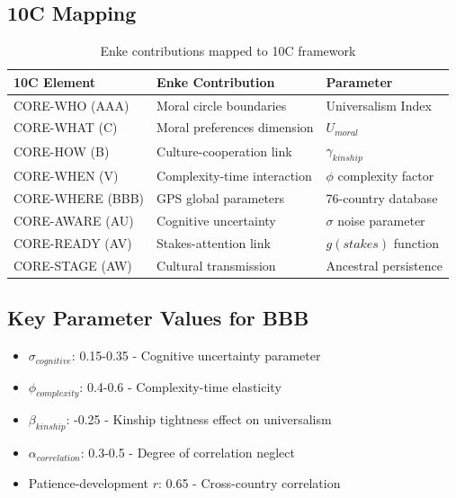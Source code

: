 \subsection{10C Mapping}

\begin{table}[h]
\centering
\begin{tabular}{lll}
\textbf{10C Element} & \textbf{Enke Contribution} & \textbf{Parameter} \\
\hline
CORE-WHO (AAA) & Moral circle boundaries & Universalism Index \\
CORE-WHAT (C) & Moral preferences dimension & $U_{moral}$ \\
CORE-HOW (B) & Culture-cooperation link & $\gamma_{kinship}$ \\
CORE-WHEN (V) & Complexity-time interaction & $\phi$ complexity factor \\
CORE-WHERE (BBB) & GPS global parameters & 76-country database \\
CORE-AWARE (AU) & Cognitive uncertainty & $\sigma$ noise parameter \\
CORE-READY (AV) & Stakes-attention link & $g(stakes)$ function \\
CORE-STAGE (AW) & Cultural transmission & Ancestral persistence \\
\end{tabular}
\caption{Enke contributions mapped to 10C framework}
\end{table}

\subsection{Key Parameter Values for BBB}

\begin{tcolorbox}[colback=green!5!white, colframe=green!75!black, title=Enke Parameters for BBB Repository]
\begin{itemize}
    \item $\sigma_{cognitive}$: 0.15-0.35 - Cognitive uncertainty parameter
    \item $\phi_{complexity}$: 0.4-0.6 - Complexity-time elasticity
    \item $\beta_{kinship}$: -0.25 - Kinship tightness effect on universalism
    \item $\alpha_{correlation}$: 0.3-0.5 - Degree of correlation neglect
    \item Patience-development $r$: 0.65 - Cross-country correlation
\end{itemize}
\end{tcolorbox}

